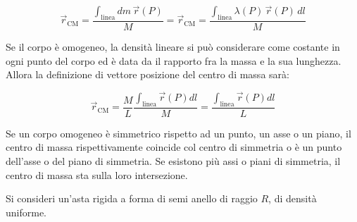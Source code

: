 \[
	\vec{r}_\text{CM} = \frac{\int_{\text{linea} }dm\,\vec{r} (P) }{M} =\vec{r}_\text{CM} = \frac{\int_{\text{linea} }\lambda(P)\,\vec{r} (P)\, dl}{M}
\]

Se il corpo è omogeneo, la densità lineare si può considerare come costante in ogni punto del corpo ed è data da il rapporto fra la massa e la sua lunghezza. Allora la definizione di vettore posizione del centro di massa sarà:

\[
	\vec{r}_\text{CM} = \frac{M}{L} \frac{\int_{\text{linea} }\vec{r} (P) dl}{M} = \frac{\int_{\text{linea} }\vec{r} (P) dl}{L}
\]

Se un corpo omogeneo è simmetrico rispetto ad un punto, un asse o un piano, il centro di massa rispettivamente coincide col centro di simmetria o è un punto dell'asse o del piano di simmetria. Se esistono più assi o piani di simmetria, il centro di massa sta sulla loro intersezione.

Si consideri un'asta rigida a forma di semi anello di raggio $R$, di densità uniforme.

